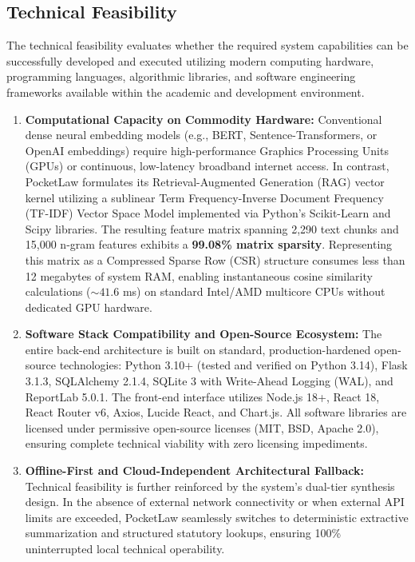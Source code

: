 \subsection{Technical Feasibility}
The technical feasibility evaluates whether the required system capabilities can be successfully developed and executed utilizing modern computing hardware, programming languages, algorithmic libraries, and software engineering frameworks available within the academic and development environment.
\begin{enumerate}
    \item \textbf{Computational Capacity on Commodity Hardware:}
    Conventional dense neural embedding models (e.g., BERT, Sentence-Transformers, or OpenAI embeddings) require high-performance Graphics Processing Units (GPUs) or continuous, low-latency broadband internet access. In contrast, PocketLaw formulates its Retrieval-Augmented Generation (RAG) vector kernel utilizing a sublinear Term Frequency-Inverse Document Frequency (TF-IDF) Vector Space Model implemented via Python's Scikit-Learn and Scipy libraries. The resulting feature matrix spanning 2,290 text chunks and 15,000 n-gram features exhibits a \textbf{99.08\% matrix sparsity}. Representing this matrix as a Compressed Sparse Row (CSR) structure consumes less than 12 megabytes of system RAM, enabling instantaneous cosine similarity calculations ($\sim 41.6$ ms) on standard Intel/AMD multicore CPUs without dedicated GPU hardware.
    
    \item \textbf{Software Stack Compatibility and Open-Source Ecosystem:}
    The entire back-end architecture is built on standard, production-hardened open-source technologies: Python 3.10+ (tested and verified on Python 3.14), Flask 3.1.3, SQLAlchemy 2.1.4, SQLite 3 with Write-Ahead Logging (WAL), and ReportLab 5.0.1. The front-end interface utilizes Node.js 18+, React 18, React Router v6, Axios, Lucide React, and Chart.js. All software libraries are licensed under permissive open-source licenses (MIT, BSD, Apache 2.0), ensuring complete technical viability with zero licensing impediments.
    
    \item \textbf{Offline-First and Cloud-Independent Architectural Fallback:}
    Technical feasibility is further reinforced by the system's dual-tier synthesis design. In the absence of external network connectivity or when external API limits are exceeded, PocketLaw seamlessly switches to deterministic extractive summarization and structured statutory lookups, ensuring 100\% uninterrupted local technical operability.
\end{enumerate}

